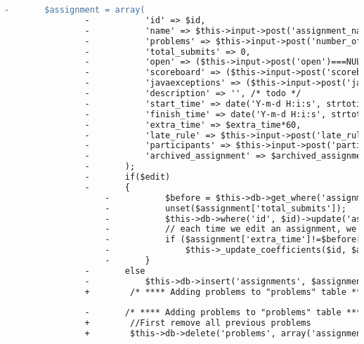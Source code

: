 \begin{lstlisting}[language=diff, caption=Perubahan pada kode Assignment\_model.php]
				-		$assignment = array(
				-			'id' => $id,
				-			'name' => $this->input->post('assignment_name'),
				-			'problems' => $this->input->post('number_of_problems'),
				-			'total_submits' => 0,
				-			'open' => ($this->input->post('open')===NULL?0:1),
				-			'scoreboard' => ($this->input->post('scoreboard')===NULL?0:1),
				-			'javaexceptions' => ($this->input->post('javaexceptions')===NULL?0:1),
				-			'description' => '', /* todo */
				-			'start_time' => date('Y-m-d H:i:s', strtotime($this->input->post('start_time'))),
				-			'finish_time' => date('Y-m-d H:i:s', strtotime($this->input->post('finish_time'))),
				-			'extra_time' => $extra_time*60,
				-			'late_rule' => $this->input->post('late_rule'),
				-			'participants' => $this->input->post('participants'),
				-			'archived_assignment' => $archived_assignment
				-		);
				-		if($edit)
				-		{
					-			$before = $this->db->get_where('assignments', array('id'=>$id))->row_array();
					-			unset($assignment['total_submits']);
					-			$this->db->where('id', $id)->update('assignments', $assignment);
					-			// each time we edit an assignment, we should update coefficient of all submissions of that assignment
					-			if ($assignment['extra_time']!=$before['extra_time'] OR $assignment['start_time']!=$before['start_time'] OR $assignment['finish_time']!=$before['finish_time'] OR $assignment['late_rule']!=$before['late_rule'])
					-				$this->_update_coefficients($id, $assignment['extra_time'], $assignment['finish_time'], $assignment['late_rule']);
					-		}
				-		else
				-			$this->db->insert('assignments', $assignment);
				+        /* **** Adding problems to "problems" table **** */
				
				-		/* **** Adding problems to "problems" table **** */
				+        //First remove all previous problems
				+        $this->db->delete('problems', array('assignment' => $id));
				

\end{lstlisting}
